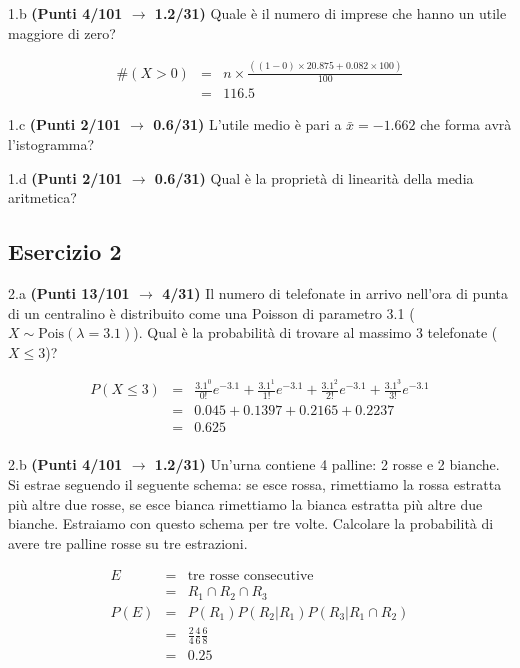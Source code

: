 \documentclass[
  11pt,
]{book}
\theoremstyle{mytheoremstyle}
\theoremstyle{mydefstyle}
\newenvironment{sol}
  {
  \begin{tcolorbox}[enhanced,breakable,arc=0.1mm,boxrule=1pt,colback=white,colframe=iblue,
  title=\bf \fontfamily{lmss}\selectfont \hspace{.5 cm} Soluzione,drop fuzzy shadow]

}{
\end{tcolorbox}
  }
\begin{document}
1.b \textbf{(Punti 4/101 \(\rightarrow\) 1.2/31)} Quale è il numero di imprese che hanno un utile maggiore di zero?

\begin{sol}
\begin{eqnarray*}
  \#(X>0) &=& n\times \frac{((1-0)\times 20.875+0.082\times 100)}{100}\\
   &=& 116.5
\end{eqnarray*}

\end{sol}

1.c \textbf{(Punti 2/101 \(\rightarrow\) 0.6/31)} L'utile medio è pari a \(\bar x=-1.662\) che forma avrà l'istogramma?

1.d \textbf{(Punti 2/101 \(\rightarrow\) 0.6/31)} Qual è la proprietà di linearità della media aritmetica?

\subsection{Esercizio 2}\label{esercizio-2-23}

2.a \textbf{(Punti 13/101 \(\rightarrow\) 4/31)} Il numero di telefonate in arrivo nell'ora di punta di un centralino è distribuito come una Poisson di parametro 3.1 (\(X\sim\text{Pois}(\lambda=3.1)\)). Qual è la probabilità di trovare al massimo 3 telefonate (\(X\le 3\))?

\begin{sol}
\begin{eqnarray*}
  P(X\le 3) &=&  \frac{3.1^0}{0!}e^{-3.1}+\frac{3.1^1}{1!}e^{-3.1}+\frac{3.1^2}{2!}e^{-3.1}+\frac{3.1^3}{3!}e^{-3.1}\\
  &=& 0.045+0.1397+0.2165+0.2237\\
  &=& 0.625\\
\end{eqnarray*}

\end{sol}

2.b \textbf{(Punti 4/101 \(\rightarrow\) 1.2/31)} Un'urna contiene 4 palline: 2 rosse e 2 bianche. Si estrae seguendo il seguente schema: se esce rossa, rimettiamo la rossa estratta più altre due rosse, se esce bianca rimettiamo la bianca estratta più altre due bianche. Estraiamo con questo schema per tre volte. Calcolare la probabilità di avere tre palline rosse su tre estrazioni.

\begin{sol}
\begin{eqnarray*}
  E &=&  \text{tre rosse consecutive}\\
  &=& R_1\cap R_2 \cap R_3\\
P(E)  &=& P(R_1)P( R_2|R_1) P( R_3|R_1\cap R_2)\\
&=& \frac 24 \frac 46 \frac 68\\
&=& 0.25
\end{eqnarray*}

\end{sol}
\end{document}
